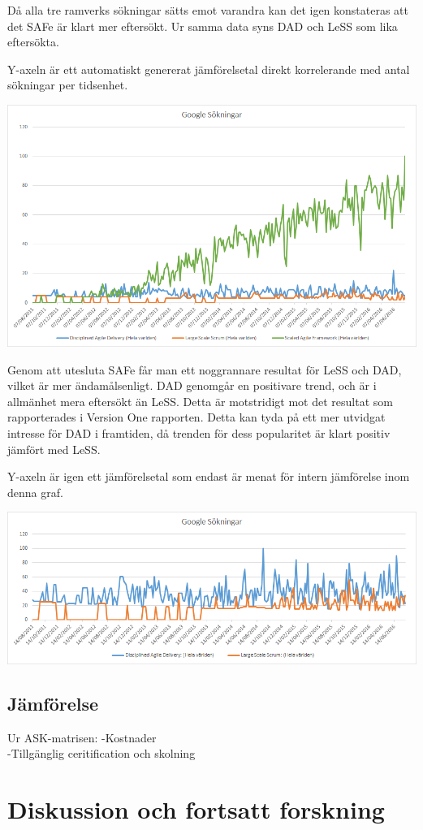 		Då alla tre ramverks sökningar sätts emot varandra kan det igen konstateras att det SAFe är klart mer eftersökt. Ur samma data syns DAD och LeSS som lika eftersökta.
		
		Y-axeln är ett automatiskt genererat jämförelsetal direkt korrelerande med antal sökningar per tidsenhet.
		\begin{center}
			\includegraphics{Grafer/Google_sokningar.png}
		\end{center}
		\cite{google_stats}
	
	
		Genom att utesluta SAFe får man ett noggrannare resultat för LeSS och DAD, vilket är mer ändamålsenligt. DAD genomgår en positivare trend, och är i allmänhet mera eftersökt än LeSS. Detta är motstridigt mot det resultat som rapporterades i Version One rapporten. Detta kan tyda på ett mer utvidgat intresse för DAD i framtiden, då trenden för dess popularitet är klart positiv jämfört med LeSS.
	
		Y-axeln är igen ett jämförelsetal som endast är menat för intern jämförelse inom denna graf.
		\begin{center}
			\includegraphics{Grafer/Google_sokningar_dad_less.png}
		\end{center}
		\cite{google_stats_dad_less}
		
		
	\subsection{Jämförelse}
		Ur ASK-matrisen:
		-Kostnader \\
		-Tillgänglig ceritification och skolning
				
				
\section{Diskussion och fortsatt forskning}
	